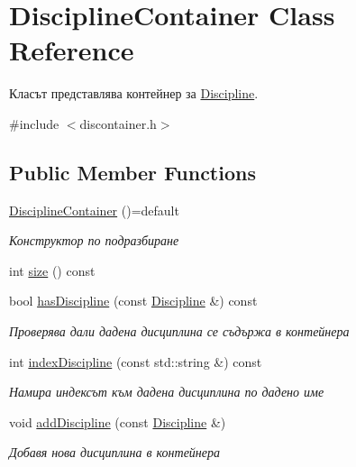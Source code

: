 \hypertarget{class_discipline_container}{}\section{Discipline\+Container Class Reference}
\label{class_discipline_container}


Класът представлява контейнер за \hyperlink{class_discipline}{Discipline}.  




{\ttfamily \#include $<$discontainer.\+h$>$}

\subsection*{Public Member Functions}
\begin{DoxyCompactItemize}
\item 
\hyperlink{class_discipline_container_a43b580c11fca8f1309abdf8384908625}{Discipline\+Container} ()=default
\begin{DoxyCompactList}\small\item\em Конструктор по подразбиране \end{DoxyCompactList}\item 
int \hyperlink{class_discipline_container_a9ecb0f7eeed76342c004bbb4389353a5}{size} () const
\item 
bool \hyperlink{class_discipline_container_a22a8e254017993dc4d51511f3ee0e14f}{has\+Discipline} (const \hyperlink{class_discipline}{Discipline} \&) const
\begin{DoxyCompactList}\small\item\em Проверява дали дадена дисциплина се съдържа в контейнера \end{DoxyCompactList}\item 
int \hyperlink{class_discipline_container_addcd8466fa548162a6be57ea779a375b}{index\+Discipline} (const std\+::string \&) const
\begin{DoxyCompactList}\small\item\em Намира индексът към дадена дисциплина по дадено име \end{DoxyCompactList}\item 
void \hyperlink{class_discipline_container_af7be4f1504b7f6dbc65ddf4af9799fcd}{add\+Discipline} (const \hyperlink{class_discipline}{Discipline} \&)
\begin{DoxyCompactList}\small\item\em Добавя нова дисциплина в контейнера \end{DoxyCompactList}\item 

\end{DoxyCompactItemize}

